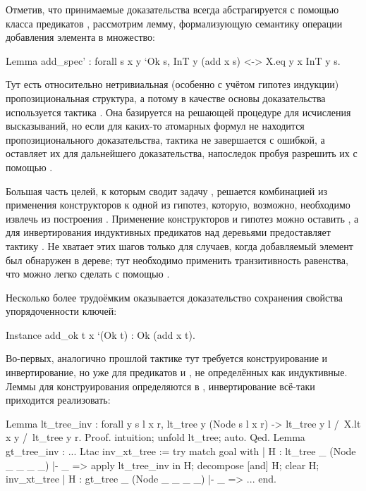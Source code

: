 \documentclass[a4paper,14pt]{extarticle}
\begin{document}
Отметив, что принимаемые доказательства 
всегда абстрагируется с помощью класса предикатов %
,
рассмотрим лемму, формализующую семантику операции
добавления элемента в множество:
\begin{coqcode}
Lemma add_spec' : forall s x y `{Ok s},
  InT y (add x s) <-> X.eq y x \/ InT y s.
\end{coqcode}

Тут есть относительно нетривиальная
(особенно с учётом гипотез индукции)
пропозициональная структура, а потому
в качестве основы доказательства используется тактика
. Она базируется на решающей процедуре
для исчисления высказываний, но если для каких-то атомарных
формул не находится пропозиционального доказательства,
тактика не завершается с ошибкой, а
оставляет их для дальнейшего доказательства, 
напоследок пробуя разрешить их с помощью
.

Большая часть целей, к которым сводит задачу
,
решается комбинацией из применения конструкторов
 к одной из гипотез,
которую, возможно, необходимо извлечь
из построения .
Применение конструкторов и гипотез
можно оставить ,
а для инвертирования
индуктивных предикатов над деревьями
 предоставляет тактику
.
Не хватает этих шагов только
для случаев, когда добавляемый элемент
был обнаружен в дереве;
тут необходимо применить транзитивность
равенства, что можно легко сделать
с помощью .

Несколько более трудоёмким оказывается доказательство
сохранения свойства упорядоченности ключей:
\begin{coqcode}
Instance add_ok t x `(Ok t) : Ok (add x t).
\end{coqcode}

Во-первых, аналогично прошлой тактике
тут требуется конструирование и инвертирование,
но уже для предикатов
 и ,
не определённых как индуктивные.
Леммы для конструирования определяются в ,
инвертирование всё-таки приходится реализовать:
\begin{coqcode}
Lemma lt_tree_inv : forall y s l x r,
  lt_tree y (Node s l x r) ->
  lt_tree y l /\ X.lt x y /\ lt_tree y r.
Proof. intuition; unfold lt_tree; auto. Qed.
Lemma gt_tree_inv : ...
Ltac inv_xt_tree := try match goal with
  | H : lt_tree _ (Node _ _ _ _) |- _ =>
    apply lt_tree_inv in H;
    decompose [and] H; clear H;
    inv_xt_tree
  | H : gt_tree _ (Node _ _ _ _) |- _ => ...
end.
\end{coqcode}
\end{document}
